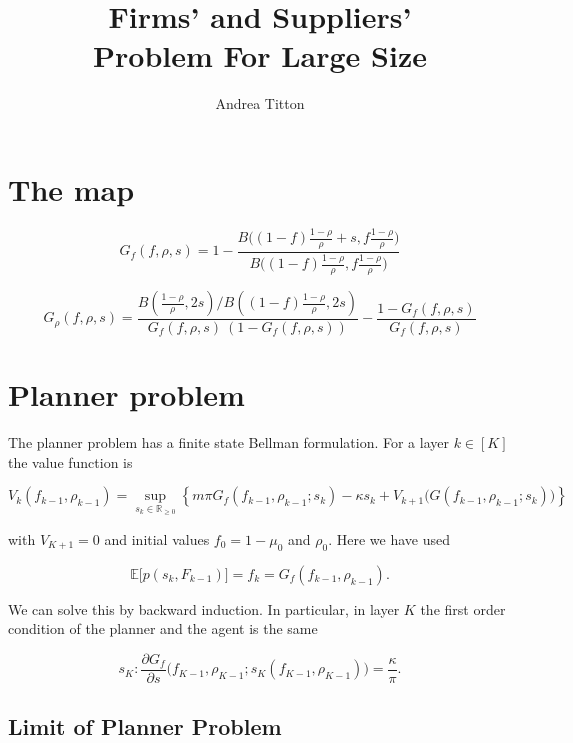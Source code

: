 \documentclass[american, abstract=on]{scrartcl}
\author{Andrea Titton}
\title{Firms' and Suppliers'\\Problem For Large Size}
\theoremstyle{plain}
\renewcommand{\Re}{\mathbb{R}}
\newcommand{\E}{\mathbb{E}}
\begin{document}
\maketitle

\section{The map}

\begin{equation}
    G_f(f, \rho, s) = 1 - \frac{B\Big( (1 - f) \frac{1 - \rho}{\rho} + s, f \frac{1 - \rho}{\rho} \Big)}{B\Big( (1 - f) \frac{1 - \rho}{\rho}, f \frac{1 - \rho}{\rho} \Big)}
\end{equation}

\begin{equation}
    G_{\rho}(f, \rho, s) = \frac{ B\left(\frac{1 - \rho}{\rho}, 2s \right) \Big/ B\left((1 - f) \frac{1 - \rho}{\rho}, 2s \right)}{G_f(f, \rho, s) \ (1 - G_f(f, \rho, s))} - \frac{1 - G_f(f, \rho, s)}{G_f(f, \rho, s)}
\end{equation}



\section{Planner problem}

The planner problem has a finite state Bellman formulation. For a layer $k \in [K]$ the value function is 

\begin{equation}
    V_k(f_{k - 1}, \rho_{k - 1}) = \sup_{s_k \in \Re_{\geq 0}} \left\{ m \pi G_f(f_{k - 1}, \rho_{k-1}; s_k) - \kappa s_k  + V_{k + 1}\Big(G(f_{k - 1}, \rho_{k-1}; s_k)\Big) \right\} 
\end{equation}

with $V_{K + 1} = 0$ and initial values $f_0 = 1 - \mu_0$ and $\rho_0$. Here we have used

\begin{equation}
    \E\Big[ p(s_k, F_{k-1}) \Big] = f_k = G_f(f_{k - 1}, \rho_{k-1}).
\end{equation}

We can solve this by backward induction. In particular, in layer $K$ the first order condition of the planner and the agent is the same 

\begin{equation}
    s_K: \frac{\partial G_f}{\partial s}\Big(f_{K-1}, \rho_{K-1}; s_{K}(f_{K-1}, \rho_{K-1})\Big) = \frac{\kappa}{\pi}.
\end{equation}

\subsection{Limit of Planner Problem}
\end{document}
